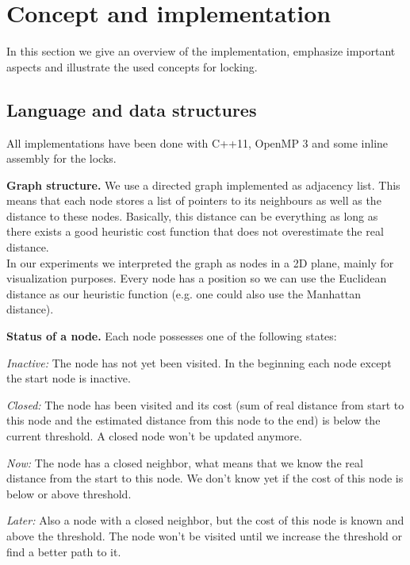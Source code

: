 \documentclass[letterpaper]{article}
\newcommand{\mypar}[1]{{\bf #1.}}
\begin{document}
\section{Concept and implementation}\label{sec:impl}

In this section we give an overview of the implementation, emphasize important aspects and illustrate the used concepts for locking. 

\subsection{Language and data structures}\label{ssec:lang}

All implementations have been done with C++11, OpenMP 3 and some inline assembly for the locks.

\mypar{Graph structure}
We use a directed graph implemented as adjacency list. This means that each node stores a list of pointers to its neighbours as well as the distance to these nodes. Basically, this distance can be everything as long as there exists a good heuristic cost function that does not overestimate the real distance. \\
In our experiments we interpreted the graph as nodes in a 2D plane, mainly for visualization purposes. Every node has a position so we can use the Euclidean distance as our heuristic function (e.g. one could also use the Manhattan distance).

\mypar{Status of a node} Each node possesses one of the following states:
\begin{compactitem}
\item \textit{Inactive:} The node has not yet been visited. In the beginning each node except the start node is inactive.
\item \textit{Closed:} The node has been visited and its cost (sum of real distance from start to this node and the estimated distance from this node to the end) is below the current threshold. A closed node won't be updated anymore.
\item \textit{Now:} The node has a closed neighbor, what means that we know the real distance from the start to this node. We don't know yet if the cost of this node is below or above threshold.
\item \textit{Later:} Also a node with a closed neighbor, but the cost of this node is known and above the threshold. The node won't be visited until we increase the threshold or find a better path to it.
\end{compactitem}
\end{document}
